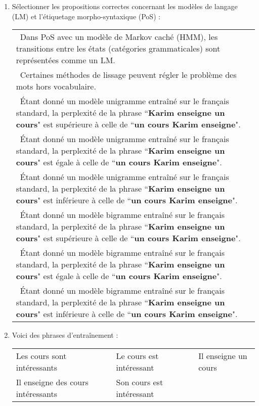 \documentclass{KodeBook}
\begin{document}
\begin{enumerate}
	\item Sélectionner les propositions correctes concernant les modèles de langage (LM) et l'étiquetage morpho-syntaxique (PoS) :
	
	\begin{longtable}{|p{}|}
		\hline 
		\Square\ Dans PoS avec un modèle de Markov caché (HMM), les transitions entre les états (catégories grammaticales) sont représentées comme un LM. \\
		\Square\ Certaines méthodes de lissage peuvent régler le problème des mots hors vocabulaire. \\
		\Square\ Étant donné un modèle unigramme entraîné sur le français standard, la perplexité de la phrase ``\textbf{Karim enseigne un cours}" est supérieure à celle de ``\textbf{un cours Karim enseigne}". \\
		\Square\ Étant donné un modèle unigramme entraîné sur le français standard, la perplexité de la phrase ``\textbf{Karim enseigne un cours}" est égale à celle de ``\textbf{un cours Karim enseigne}".\\
		\Square\ Étant donné un modèle unigramme entraîné sur le français standard, la perplexité de la phrase ``\textbf{Karim enseigne un cours}" est inférieure à celle de ``\textbf{un cours Karim enseigne}".\\
		\Square\ Étant donné un modèle bigramme entraîné sur le français standard, la perplexité de la phrase ``\textbf{Karim enseigne un cours}" est supérieure à celle de ``\textbf{un cours Karim enseigne}".\\
		\Square\ Étant donné un modèle bigramme entraîné sur le français standard, la perplexité de la phrase ``\textbf{Karim enseigne un cours}" est égale à celle de ``\textbf{un cours Karim enseigne}".\\
		\Square\ Étant donné un modèle bigramme entraîné sur le français standard, la perplexité de la phrase ``\textbf{Karim enseigne un cours}" est inférieure à celle de ``\textbf{un cours Karim enseigne}".\\
		
		\hline
	\end{longtable}

	\item Voici des phrases d'entraînement : 
	
	\begin{tabular}{|lllll|}
		\hline
		Les cours sont intéressants && Le cours est intéressant && Il enseigne un cours \\
		Il enseigne des cours intéressants && Son cours est intéressant &&\\
		\hline
	\end{tabular}


\end{enumerate}
\end{document}
